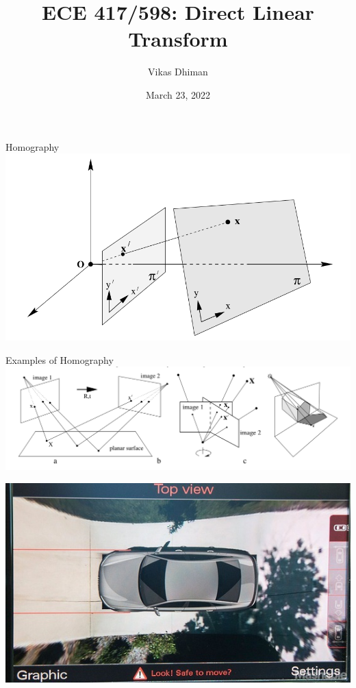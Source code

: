 \documentclass[times,t]{beamer}
\title{ECE 417/598: Direct Linear Transform }
\author{Vikas Dhiman}
\date{March 23, 2022}
\begin{document}
\newcommand{\ubfu}{\underline{\bfu}}
\newcommand{\ubfx}{\underline{\bfx}}
\begin{frame}
  \titlepage
  \end{frame}

\begin{frame}{Homography}
  \includegraphics[width=\linewidth]{media/homography-maps-a-line-to-a-line.png}
\end{frame}

\begin{frame}{Examples  of  Homography}
  \includegraphics[width=\linewidth]{media/examples-of-homography.png}
\end{frame}

\begin{frame}
  \includegraphics[width=0.60\linewidth]{media/audi top view camera.jpg}
\end{frame}
\end{document}
